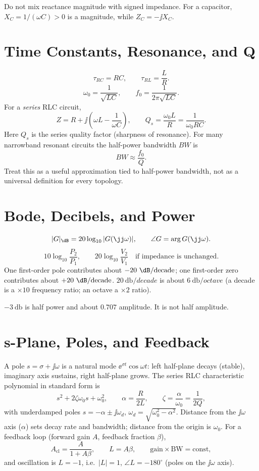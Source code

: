 \begin{mistakebox}
Do not mix reactance magnitude with signed impedance. For a capacitor,
\(X_C=1/(\omega C)>0\) is a magnitude, while \(Z_C=-\jj X_C\).
\end{mistakebox}

\section{Time Constants, Resonance, and Q}
\[
\tau_{RC}=RC,\qquad \tau_{RL}=\frac{L}{R}.
\]
\[
\omega_0=\frac{1}{\sqrt{LC}},
\qquad
f_0=\frac{1}{2\pi\sqrt{LC}}.
\]
For a \emph{series} RLC circuit,
\[
Z=R+\jj\left(\omega L-\frac{1}{\omega C}\right),
\qquad
Q_s=\frac{\omega_0 L}{R}=\frac{1}{\omega_0 R C}.
\]
Here \(Q_s\) is the series quality factor (sharpness of resonance). For many
narrowband resonant circuits the half-power bandwidth \(BW\) is
\[
BW\approx \frac{f_0}{Q}.
\]
Treat this as a useful approximation tied to half-power bandwidth, not as a
universal definition for every topology.

\section{Bode, Decibels, and Power}
\[
|G|_{\dB}=20\log_{10}|G(\jj\omega)|,
\qquad
\angle G=\arg G(\jj\omega).
\]
\[
10\log_{10}\frac{P_2}{P_1},\qquad
20\log_{10}\frac{V_2}{V_1}\quad \text{if impedance is unchanged.}
\]
One first-order pole contributes about \(-20~\dB/\mathrm{decade}\); one
first-order zero contributes about \(+20~\dB/\mathrm{decade}\).
\(\SI{20}{\decibel/decade}\) is about \(\SI{6}{\decibel/octave}\) (a decade is a
\(\times10\) frequency ratio; an octave a \(\times2\) ratio).

\begin{mistakebox}
\(-\SI{3}{\decibel}\) is half power and about \(0.707\) amplitude. It is not
half amplitude.
\end{mistakebox}

\section{s-Plane, Poles, and Feedback}
A pole \(s=\sigma+\jj\omega\) is a natural mode \(\ee^{\sigma t}\cos\omega t\):
left half-plane decays (stable), imaginary axis sustains, right half-plane grows.
The series RLC characteristic polynomial in standard form is
\[
s^2+2\zeta\omega_0 s+\omega_0^2,
\qquad
\alpha=\frac{R}{2L},
\qquad
\zeta=\frac{\alpha}{\omega_0}=\frac{1}{2Q},
\]
with underdamped poles \(s=-\alpha\pm\jj\omega_d\), \(\omega_d=\sqrt{\omega_0^2-\alpha^2}\).
Distance from the \(\jj\omega\) axis (\(\alpha\)) sets decay rate and bandwidth;
distance from the origin is \(\omega_0\). For a feedback loop (forward gain \(A\),
feedback fraction \(\beta\)),
\[
A_{\mathrm{cl}}=\frac{A}{1+A\beta},
\qquad
L=A\beta,
\qquad
\text{gain}\times\text{BW}=\text{const},
\]
and oscillation is \(L=-1\), i.e.\ \(|L|=1\), \(\angle L=-180^\circ\) (poles on the
\(\jj\omega\) axis).

